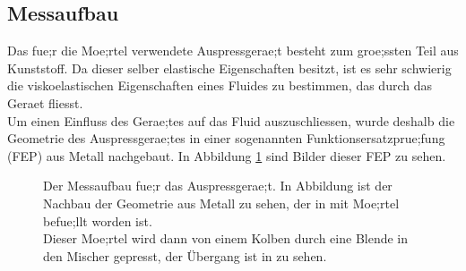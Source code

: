 \subsection{Messaufbau}
Das fue;r die Moe;rtel verwendete Auspressgerae;t besteht zum groe;ssten Teil aus Kunststoff. Da dieser selber elastische Eigenschaften besitzt, ist es sehr schwierig die viskoelastischen Eigenschaften eines Fluides zu bestimmen, das durch das Geraet fliesst.\\
Um einen Einfluss des Gerae;tes auf das Fluid auszuschliessen, wurde deshalb die Geometrie des Auspressgerae;tes in einer sogenannten Funktionsersatzprue;fung (FEP) aus Metall nachgebaut. In Abbildung \ref{fig:FEP} sind Bilder dieser FEP zu sehen.
%
\begin{figure}
    \centering
    \caption{Der Messaufbau fue;r das Auspressgerae;t. In Abbildung  ist der Nachbau der Geometrie aus Metall zu sehen, der in  mit Moe;rtel befue;llt worden ist.\\
    Dieser Moe;rtel wird dann von einem Kolben durch eine Blende in den Mischer gepresst, der Übergang ist in  zu sehen.}
    \label{fig:FEP}
\end{figure}
%
